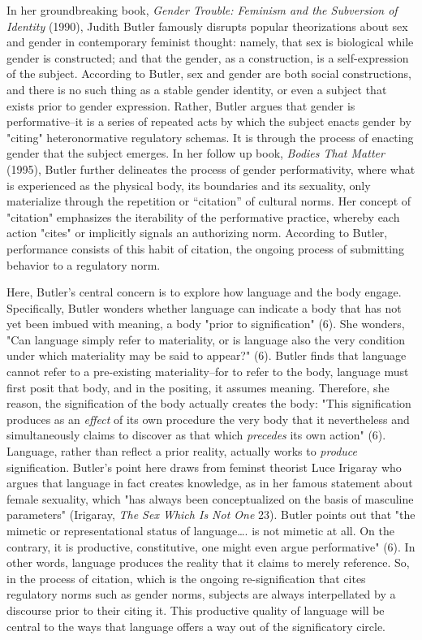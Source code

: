 \documentclass[11pt]{article}
\begin{document}
In her groundbreaking book, \emph{Gender Trouble: Feminism and the
Subversion of Identity} (1990), Judith Butler famously disrupts
popular theorizations about sex and gender in contemporary feminist
thought: namely, that sex is biological while gender is constructed;
and that the gender, as a construction, is a self-expression of the
subject. According to Butler, sex and gender are both social
constructions, and there is no such thing as a stable gender identity,
or even a subject that exists prior to gender expression. Rather,
Butler argues that gender is performative--it is a series of repeated
acts by which the subject enacts gender by "citing" heteronormative
regulatory schemas. It is through the process of enacting gender that
the subject emerges. In her follow up book, \emph{Bodies That Matter}
(1995), Butler further delineates the process of gender
performativity, where what is experienced as the physical body, its
boundaries and its sexuality, only materialize through the repetition
or “citation” of cultural norms. Her concept of "citation" emphasizes
the iterability of the performative practice, whereby each action
"cites" or implicitly signals an authorizing norm. According to
Butler, performance consists of this habit of citation, the ongoing
process of submitting behavior to a regulatory norm.

Here, Butler's central concern is to explore how language and the body
engage. Specifically, Butler wonders whether language can indicate a
body that has not yet been imbued with meaning, a body "prior to
signification" (6). She wonders, "Can language simply refer to
materiality, or is language also the very condition under which
materiality may be said to appear?" (6). Butler finds that language
cannot refer to a pre-existing materiality--for to refer to the body,
language must first posit that body, and in the positing, it assumes
meaning. Therefore, she reason, the signification of the body actually
creates the body: "This signification produces as an \emph{effect} of its
own procedure the very body that it nevertheless and simultaneously
claims to discover as that which \emph{precedes} its own action"
(6). Language, rather than reflect a prior reality, actually works to
\emph{produce} signification. Butler's point here draws from feminst
theorist Luce Irigaray who argues that language in fact creates
knowledge, as in her famous statement about female sexuality, which
"has always been conceptualized on the basis of masculine parameters"
(Irigaray, \emph{The Sex Which Is Not One} 23). Butler points out that "the
mimetic or representational status of language\ldots{}. is not mimetic at
all. On the contrary, it is productive, constitutive, one might even
argue performative" (6). In other words, language produces the reality
that it claims to merely reference. So, in the process of citation,
which is the ongoing re-signification that cites regulatory norms such
as gender norms, subjects are always interpellated by a discourse
prior to their citing it. This productive quality of language will be
central to the ways that language offers a way out of the
significatory circle.
\end{document}
